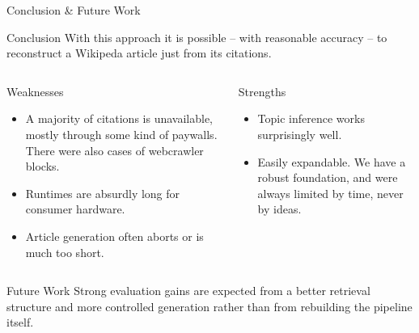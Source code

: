 \documentclass[aspectratio=169,12pt]{beamer}
\begin{document}
\begin{frame}[t]{Conclusion \& Future Work}
\vspace{-0.10cm}
\hspace*{-0.025\textwidth}%
\begin{minipage}{1.05\textwidth}
\begin{block}{Conclusion}
\scriptsize
\justifying
With this approach it is possible -- with reasonable accuracy -- to reconstruct a Wikipeda article just from its citations.
\end{block}

\vspace{0.08cm}
\begin{columns}[T,totalwidth=\linewidth,onlytextwidth]
\begin{block}{Weaknesses}
\scriptsize
\begin{itemize}
  \item A majority of citations is unavailable, mostly through some kind of paywalls. There were also cases of webcrawler blocks.
  \item Runtimes are absurdly long for consumer hardware.
  \item Article generation often aborts or is much too short.
\end{itemize}
\end{block}

\begin{block}{Strengths}
\scriptsize
\begin{itemize}
  \item Topic inference works surprisingly well.
  \item Easily expandable. We have a robust foundation, and were always limited by time, never by ideas.
\end{itemize}
\end{block}
\end{columns}

\vspace{0.04cm}
\begin{alertblock}{Future Work}
\scriptsize
Strong evaluation gains are expected from a better retrieval structure and more controlled generation rather than from rebuilding the pipeline itself.
\end{alertblock}

\end{minipage}
\end{frame}
\end{document}
